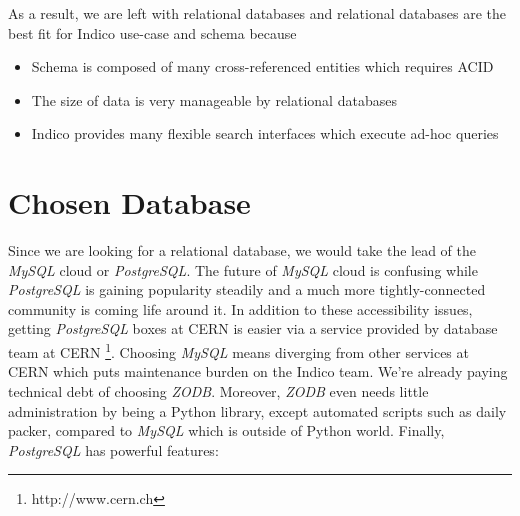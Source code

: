 As a result, we are left with relational databases and relational databases are the best fit for Indico use-case and schema because

\begin{itemize}
  \item Schema is composed of many cross-referenced entities which requires ACID
  \item The size of data is very manageable by relational databases
  \item Indico provides many flexible search interfaces which execute ad-hoc queries 
\end{itemize}

\section{Chosen Database}

Since we are looking for a relational database, we would take the lead of the \textit{MySQL} cloud or \textit{PostgreSQL}. The future of \textit{MySQL} cloud is confusing while \textit{PostgreSQL} is gaining popularity steadily and a much more tightly-connected community is coming life around it. In addition to these accessibility issues, getting \textit{PostgreSQL} boxes at CERN is easier via a service provided by database team at CERN \footnote{http://www.cern.ch}. Choosing \textit{MySQL} means diverging from other services at CERN which puts maintenance burden on the Indico team. We're already paying technical debt of choosing \textit{ZODB}. Moreover, \textit{ZODB} even needs little administration by being a Python library, except automated scripts such as daily packer, compared to \textit{MySQL} which is outside of Python world. Finally, \textit{PostgreSQL} has powerful features:

